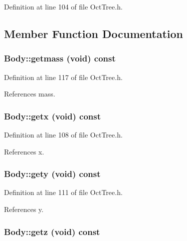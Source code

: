 Definition at line 104 of file OctTree.h.



\subsection{Member Function Documentation}
\subsubsection[{getmass}]{ Body::getmass (void) const}\label{classBody_a348e0a926450c921e680a00cb702360a}


Definition at line 117 of file OctTree.h.



References mass.

\subsubsection[{getx}]{ Body::getx (void) const}\label{classBody_a61966095d7c49f9f5cfbd6b44ee4038e}


Definition at line 108 of file OctTree.h.



References x.

\subsubsection[{gety}]{ Body::gety (void) const}\label{classBody_a95027faddf26cb1f9f817fa0e0ac5fc5}


Definition at line 111 of file OctTree.h.



References y.

\subsubsection[{getz}]{ Body::getz (void) const}\label{classBody_a1de0ff2646d7eafad6b85f786f635172}


